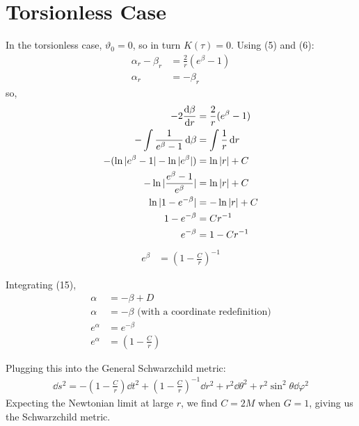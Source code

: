 \documentclass[12pt]{article}
\begin{document}
\section*{Torsionless Case}

In the torsionless case, $\vartheta_0 = 0$, so in turn $K(\tau) = 0$. Using (5) and (6):
\begin{align}
  \alpha_r - \beta_r &= \frac{2}{r}(e^\beta - 1) \\
  \alpha_r &= -\beta_r
\end{align}
so,
\begin{align*}
  -2\dv{\beta}{r} &= \frac{2}{r}(e^\beta - 1) \\
  -\int\frac{1}{e^\beta - 1}\dd{\beta} &= \int\frac{1}{r}\dd{r} \\
  -(\ln|e^\beta - 1| - \ln|e^\beta|) &= \ln|r| + C \\
  -\ln|\frac{e^\beta - 1}{e^\beta}| &= \ln|r| + C \\
  \ln|1-e^{-\beta}| &= -\ln|r| + C \\
  1-e^{-\beta} &= Cr^{-1} \\
  e^{-\beta} &= 1-Cr^{-1}
\end{align*}
\begin{align}
  e^\beta &= \left(1-\frac{C}{r}\right)^{-1}
\end{align}

Integrating (15),
\begin{align}
  \alpha &= -\beta + D \nonumber\\
  \alpha &= -\beta \text{ (with a coordinate redefinition)} \nonumber \\
  e^\alpha &= e^{-\beta} \nonumber \\
  e^\alpha &= \left(1-\frac{C}{r}\right)
\end{align}

Plugging this into the General Schwarzchild metric:
\begin{align}
  \dd{s^2} = -\left(1-\frac{C}{r}\right)\dd{t^2} + \left(1-\frac{C}{r}\right)^{-1}\dd{r^2} + r^2\dd{\theta^2} + r^2\sin^2{\theta}\dd{\varphi^2}
\end{align}
Expecting the Newtonian limit at large $r$, we find $C = 2M$ when $G=1$, giving us the Schwarzchild metric.
\end{document}
